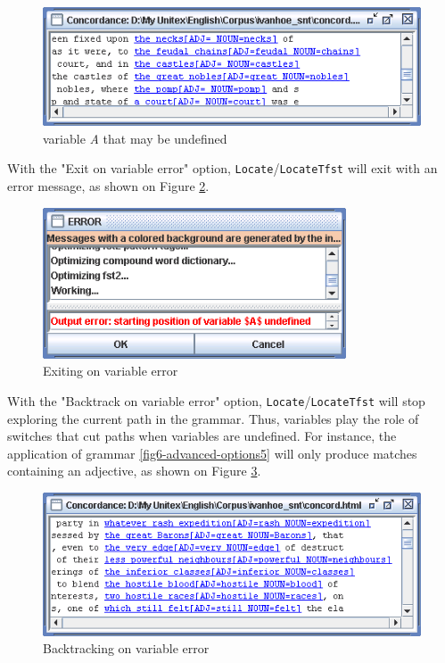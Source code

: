 \bigskip
\begin{figure}[!h]
\begin{center}
\includegraphics[width=12cm]{resources/img/fig6-advanced-options6.png}
\caption{
 variable \textit{A} that may be
undefined\label{fig6-advanced-options6}}
\end{center}
\end{figure}


\noindent With the "Exit on variable error" option, \verb+Locate+/\verb+LocateTfst+
will exit with an error message, as shown on Figure
\ref{fig6-advanced-options7}.

\bigskip
\begin{figure}[!h]
\begin{center}
\includegraphics[width=9cm]{resources/img/fig6-advanced-options7.png}
\caption{Exiting on variable error\label{fig6-advanced-options7}}
\end{center}
\end{figure}

\noindent With the "Backtrack on variable error" option,
\verb+Locate+/\verb+LocateTfst+ will stop exploring the current path in the
grammar. Thus, variables play the role of switches that cut paths
when variables are undefined. For instance, the application of grammar
\ref{fig6-advanced-options5} will only produce matches containing an adjective, as shown on Figure 
\ref{fig6-advanced-options8}. 

\bigskip
\begin{figure}[!h]
\begin{center}
\includegraphics[width=13cm]{resources/img/fig6-advanced-options8.png}
\caption{Backtracking on variable error\label{fig6-advanced-options8}}
\end{center}
\end{figure}



